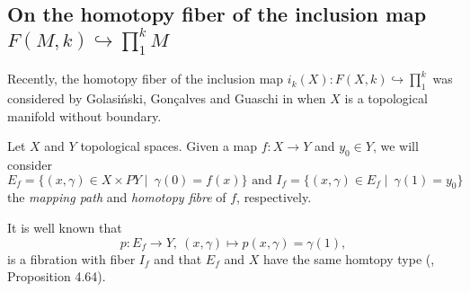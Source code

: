 \documentclass{amsart}
\theoremstyle{definition}
\numberwithin{equation}{section}
\begin{document}
\newpage
%
%
\newpage

\subsection{On the homotopy fiber of the inclusion map $F(M,k)\hookrightarrow \prod_{1}^{k}M$}

Recently, the homotopy fiber of the inclusion map $i_k(X):F(X,k)\hookrightarrow \prod_{1}^{k}$ was considered by Golasi{\'n}ski,  Gon{\c{c}}alves and Guaschi in \cite{golasinski2017homotopy} when $X$ is a topological manifold without boundary.

Let $X$ and $Y$ topological spaces. Given a map $f:X\longrightarrow Y$ and $y_0\in Y$, we will consider
\begin{equation}
E_f=\{(x,\gamma)\in X\times PY\mid~\gamma(0)=f(x)\} \text{ and } I_f=\{(x,\gamma)\in E_f\mid~\gamma(1)=y_0\}
\end{equation} the \textit{mapping path} and \textit{homotopy fibre} of $f$, respectively.

It is well known that \begin{equation}
p:E_f\longrightarrow Y,~(x,\gamma)\mapsto p(x,\gamma)=\gamma(1),
\end{equation} is a fibration with fiber $I_f$ and that $E_f$ and $X$ have the same homtopy type (\cite{hatcher2002algebraic}, Proposition 4.64).
\end{document}
